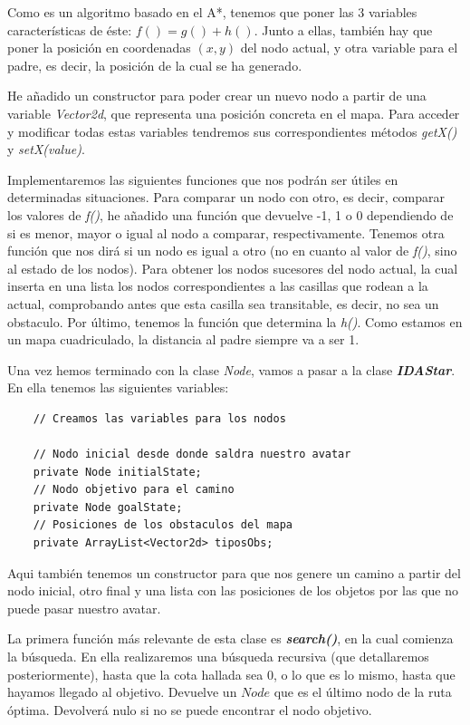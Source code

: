 \documentclass[11pt,a4paper]{article}
\begin{document}
Como es un algoritmo basado en el A*, tenemos que poner las 3 variables características de éste: $f()=g() + h()$.
Junto a ellas, también hay que poner la posición en coordenadas $(x,y)$ del nodo actual, y otra variable para
el padre, es decir, la posición de la cual se ha generado.

He añadido un constructor para poder crear un nuevo nodo a partir de una variable \textit{Vector2d}, que
representa una posición concreta en el mapa. Para acceder y modificar todas estas variables tendremos sus
correspondientes métodos \textit{getX()} y \textit{setX(value)}.

Implementaremos las siguientes funciones que nos podrán ser útiles en determinadas situaciones. Para comparar
un nodo con otro, es decir, comparar los valores de \textit{f()}, he añadido una función que devuelve -1, 1 o 0
dependiendo de si es menor, mayor o igual al nodo a comparar, respectivamente. Tenemos otra función que nos
dirá si un nodo es igual a otro (no en cuanto al valor de \textit{f()}, sino al estado de los nodos). Para
obtener los nodos sucesores del nodo actual, la cual inserta en una lista los nodos correspondientes a las
casillas que rodean a la actual, comprobando antes que esta casilla sea transitable, es decir, no sea un
obstaculo. Por último, tenemos la función que determina la \textit{h()}. Como estamos en un mapa cuadriculado,
la distancia al padre siempre va a ser 1.

Una vez hemos terminado con la clase \textit{Node}, vamos a pasar a la clase \textbf{\textit{IDAStar}}. En
ella tenemos las siguientes variables:
\begin{lstlisting}
    // Creamos las variables para los nodos

    // Nodo inicial desde donde saldra nuestro avatar
    private Node initialState;
    // Nodo objetivo para el camino
    private Node goalState;
    // Posiciones de los obstaculos del mapa
    private ArrayList<Vector2d> tiposObs;

\end{lstlisting}

Aqui también tenemos un constructor para que nos genere un camino a partir del nodo inicial, otro final y una
lista con las posiciones de los objetos por las que no puede pasar nuestro avatar.

La primera función más relevante de esta clase es \textbf{\textit{search()}}, en la cual comienza la
búsqueda. En ella realizaremos una búsqueda recursiva (que detallaremos posteriormente), hasta que la cota
hallada sea 0, o lo que es lo mismo, hasta que hayamos llegado al objetivo. Devuelve un $Node$ que es el
último nodo de la ruta óptima. Devolverá nulo si no se puede encontrar el nodo objetivo.
\end{document}
